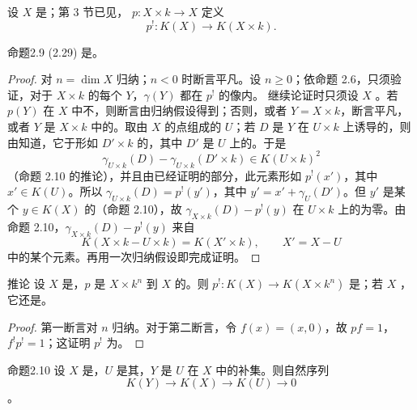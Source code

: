 设 $X$ 是；第 3 节已见， $p:X\times k\to X$ 定义
\[
p^!:K(X)\longrightarrow K(X\times k).\tag{2.29}
\]
\begin{SGAresult}{命题}{2.9} (2.29) 是。\end{SGAresult}
\begin{proof}
对 $n=\dim X$ 归纳；$n<0$ 时断言平凡。设 $n\geq0$；依命题 2.6，只须验证，对于 $X\times k$ 的每个 $Y$，$\gamma(Y)$ 都在 $p^!$ 的像内。
继续论证时只须设 $X$ 。若 $p(Y)$ 在 $X$ 中不，则断言由归纳假设得到；否则，或者 $Y=X\times k$，断言平凡，或者 $Y$ 是 $X\times k$ 中的。取由 $X$ 的点组成的 $U$；若 $D$ 是 $Y$ 在 $U\times k$ 上诱导的，则由知道，它于形如 $D'\times k$ 的，其中 $D'$ 是 $U$ 上的。于是
\[
\gamma_{U\times k}(D)-\gamma_{U\times k}(D'\times k)\in K(U\times k)^2
\]
（命题 2.10 的推论），并且由已经证明的部分，此元素形如 $p^!(x')$，其中 $x'\in K(U)$。所以 $\gamma_{U\times k}(D)=p^!(y')$，其中 $y'=x'+\gamma_U(D')$。但 $y'$ 是某个 $y\in K(X)$ 的（命题 2.10），故 $\gamma_{X\times k}(D)-p^!(y)$ 在 $U\times k$ 上的为零。由命题 2.10，$\gamma_{X\times k}(D)-p^!(y)$ 来自
\[
K(X\times k-U\times k)=K(X'\times k),\qquad X'=X-U
\]
中的某个元素。再用一次归纳假设即完成证明。
\end{proof}
\begin{SGAresult}{推论}{}
设 $X$ 是，$p$ 是 $X\times k^n$ 到 $X$ 的。则 $p^!:K(X)\to K(X\times k^n)$ 是；若 $X$ ，它还是。
\end{SGAresult}
\begin{proof}
第一断言对 $n$ 归纳。对于第二断言，令 $f(x)=(x,0)$，故 $pf=1$，$f^!p^!=1$；这证明 $p^!$ 为。
\end{proof}
\begin{SGAresult}{命题}{2.10}
设 $X$ 是，$U$ 是其，$Y$ 是 $U$ 在 $X$ 中的补集。则自然序列
\[
K(Y)\longrightarrow K(X)\longrightarrow K(U)\longrightarrow0\tag{2.30}
\]
。
\end{SGAresult}
